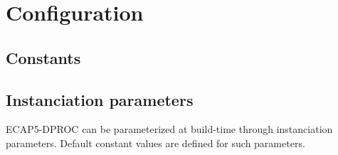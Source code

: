 \section{Configuration}

  \subsection{Constants}

    

  \subsection{Instanciation parameters}

    \begin{content}
        ECAP5-DPROC can be parameterized at build-time through instanciation parameters. Default constant values are defined for such parameters.
      \end{content}

    

\newpage

